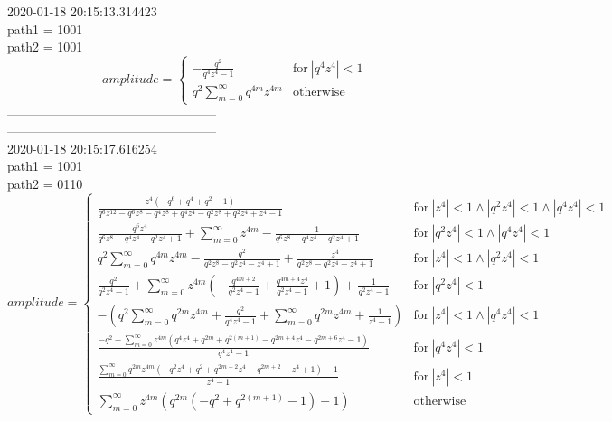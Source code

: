 2020-01-18 20:15:13.314423\\
path1 = 1001\\
path2 = 1001\\
$$amplitude = \begin{cases} - \frac{q^{2}}{q^{4} z^{4} - 1} & \text{for}\: \left|{q^{4} z^{4}}\right| < 1 \\q^{2} \sum_{m=0}^{\infty} q^{4 m} z^{4 m} & \text{otherwise} \end{cases}$$
--------------------------------------------------\\
--------------------------------------------------\\
2020-01-18 20:15:17.616254\\
path1 = 1001\\
path2 = 0110\\
$$amplitude = \begin{cases} \frac{z^{4} \left(- q^{6} + q^{4} + q^{2} - 1\right)}{q^{6} z^{12} - q^{6} z^{8} - q^{4} z^{8} + q^{4} z^{4} - q^{2} z^{8} + q^{2} z^{4} + z^{4} - 1} & \text{for}\: \left|{z^{4}}\right| < 1 \wedge \left|{q^{2} z^{4}}\right| < 1 \wedge \left|{q^{4} z^{4}}\right| < 1 \\\frac{q^{6} z^{4}}{q^{6} z^{8} - q^{4} z^{4} - q^{2} z^{4} + 1} + \sum_{m=0}^{\infty} z^{4 m} - \frac{1}{q^{6} z^{8} - q^{4} z^{4} - q^{2} z^{4} + 1} & \text{for}\: \left|{q^{2} z^{4}}\right| < 1 \wedge \left|{q^{4} z^{4}}\right| < 1 \\q^{2} \sum_{m=0}^{\infty} q^{4 m} z^{4 m} - \frac{q^{2}}{q^{2} z^{8} - q^{2} z^{4} - z^{4} + 1} + \frac{z^{4}}{q^{2} z^{8} - q^{2} z^{4} - z^{4} + 1} & \text{for}\: \left|{z^{4}}\right| < 1 \wedge \left|{q^{2} z^{4}}\right| < 1 \\\frac{q^{2}}{q^{2} z^{4} - 1} + \sum_{m=0}^{\infty} z^{4 m} \left(- \frac{q^{4 m + 2}}{q^{2} z^{4} - 1} + \frac{q^{4 m + 4} z^{4}}{q^{2} z^{4} - 1} + 1\right) + \frac{1}{q^{2} z^{4} - 1} & \text{for}\: \left|{q^{2} z^{4}}\right| < 1 \\- (q^{2} \sum_{m=0}^{\infty} q^{2 m} z^{4 m} + \frac{q^{2}}{q^{4} z^{4} - 1} + \sum_{m=0}^{\infty} q^{2 m} z^{4 m} + \frac{1}{z^{4} - 1}) & \text{for}\: \left|{z^{4}}\right| < 1 \wedge \left|{q^{4} z^{4}}\right| < 1 \\\frac{- q^{2} + \sum_{m=0}^{\infty} z^{4 m} \left(q^{4} z^{4} + q^{2 m} + q^{2 \left(m + 1\right)} - q^{2 m + 4} z^{4} - q^{2 m + 6} z^{4} - 1\right)}{q^{4} z^{4} - 1} & \text{for}\: \left|{q^{4} z^{4}}\right| < 1 \\\frac{\sum_{m=0}^{\infty} q^{2 m} z^{4 m} \left(- q^{2} z^{4} + q^{2} + q^{2 m + 2} z^{4} - q^{2 m + 2} - z^{4} + 1\right) - 1}{z^{4} - 1} & \text{for}\: \left|{z^{4}}\right| < 1 \\\sum_{m=0}^{\infty} z^{4 m} \left(q^{2 m} \left(- q^{2} + q^{2 \left(m + 1\right)} - 1\right) + 1\right) & \text{otherwise} \end{cases}$$

